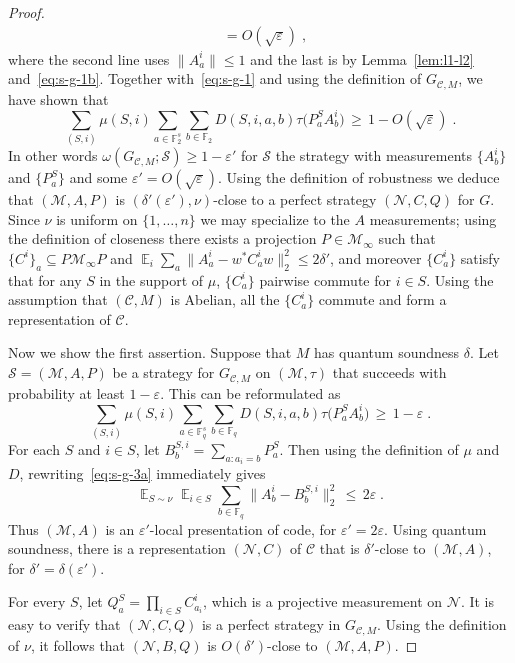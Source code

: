 \documentclass[11pt]{article}
\theoremstyle{definition}
\newcommand{\code}{\mathcal{C}}
\newcommand{\strategy}{\mathscr{S}}
\DeclareMathOperator*{\Expectation}{\mathbb{E}}
\newcommand{\Es}[1]{\Expectation_{#1}}
\newcommand{\field}{\mathbb{F}_2}
\newcommand{\F}{\ensuremath{\mathbb{F}}}
\newcommand{\mM}{\ensuremath{\mathcal{M}}}
\newcommand{\eps}{\varepsilon}
\newcommand{\mN}{\mathcal{N}}
\begin{document}
\begin{proof}
\begin{align}
&= O(\sqrt{\eps})\;,\label{eq:s-g-2}
\end{align}
where the second line uses $\|A^i_a\|\leq 1$ and the last is by Lemma~\ref{lem:l1-l2} and~\eqref{eq:s-g-1b}.
Together with~\eqref{eq:s-g-1} and using the definition of $G_{\code,M}$, we have shown that
\begin{equation}
 \sum_{(S,i)} \mu(S,i) \sum_{a\in \field^s}\sum_{b\in\field} D(S,i,a,b) \tau\big(  P^S_a  A^i_{b}\big) \,\geq \,1-O(\sqrt{\eps})\;.\label{eq:s-g-4}
\end{equation}
In other words $\omega(G_{\code,M};\strategy)\geq 1-\eps'$ for $\strategy$ the strategy with measurements $\{A^i_b\}$ and $\{P^{S}_a\}$ and some $\eps'=O(\sqrt{\eps})$. Using the definition of robustness we deduce that $(\mM,A,P)$ is $(\delta'(\eps'),\nu)$-close to a perfect strategy $(\mN,C,Q)$ for $G$. Since $\nu$ is uniform on $\{1,\ldots,n\}$ we may specialize to the $A$ measurements; using the definition of closeness there exists a projection $P\in \mM_\infty$ such that $\{C^i\}_a \subseteq P\mM_\infty P$ and $\Es{i}\sum_a \|A^i_a-w^* C^i_a w \|_2^2 \leq 2\delta'$, and moreover $\{C^i_a\}$ satisfy that for any $S$ in the support of $\mu$, $\{C^i_a\}$ pairwise commute for $i\in S$. Using the assumption that $(\code,M)$ is Abelian, all the $\{C^i_a\}$ commute and form a representation of $\code$.

Now we show the first assertion. Suppose that $M$ has quantum soundness $\delta$.
Let $\strategy=(\mM,A,P)$ be a strategy for $G_{\code,M}$ on $(\mM,\tau)$ that succeeds with probability at least $1-\eps$. This can be reformulated as 
\begin{equation}
 \sum_{(S,i)} \mu(S,i) \sum_{a\in \F_q^s}\sum_{b\in\F_q} D(S,i,a,b) \tau\big(  P^S_a  A^i_{b}\big) \,\geq \,1-\eps\;.\label{eq:s-g-3a}
\end{equation}
For each $S$ and $i\in S$, let $B^{S,i}_b = \sum_{a:a_i=b} P^S_a$. Then using the definition of $\mu$ and $D$, rewriting~\eqref{eq:s-g-3a} immediately gives
\begin{equation}
 \Es{S\sim \nu} \Es{i\in S} \sum_{b\in\F_q} \big\| A^i_{b} - B^{S,i}_b\big\|_2^2 \,\leq \,2\eps\;.\label{eq:s-g-3}
\end{equation}
Thus $(\mM,A)$ is an $\eps'$-local presentation of code, for $\eps'=2\eps$. Using quantum soundness, there is a representation $(\mN,C)$ of $\code$ that is $\delta'$-close to $(\mM,A)$, for $\delta'=\delta(\eps')$. 

For every $S$, let $Q^S_a = \prod_{i\in S} C^i_{a_i}$, which is a projective measurement on $\mN$. It is easy to verify that $(\mN,C,Q)$ is a perfect strategy in $G_{\code,M}$. Using the definition of $\nu$, it follows that   $(\mN,B,Q)$ is $O({\delta'})$-close to $(\mM,A,P)$.


\end{proof}
\end{document}
